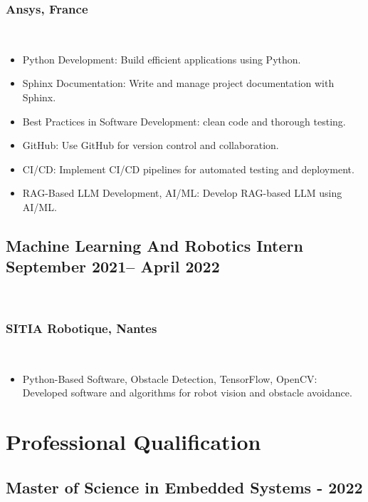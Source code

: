 \documentclass[12pt]{article}
\begin{document}
\subsubsection{Ansys, France} \\ \smallskip
\begin{itemize}
    \item[\textbullet] Python Development: Build efficient applications using Python.
    \item[\textbullet] Sphinx Documentation: Write and manage project documentation with Sphinx.
    \item[\textbullet] Best Practices in Software Development: clean code and thorough testing.
    \item[\textbullet] GitHub: Use GitHub for version control and collaboration.
    \item[\textbullet] CI/CD: Implement CI/CD pipelines for automated testing and deployment.
    \item[\textbullet] RAG-Based LLM Development, AI/ML: Develop RAG-based LLM using AI/ML.
\end{itemize}

\subsection{Machine Learning And Robotics Intern \hfill \normalfont September 2021-- April 2022} \\ \smallskip
\subsubsection{SITIA Robotique, Nantes} \\ \smallskip
\begin{itemize}
    \item[\textbullet] Python-Based Software, Obstacle Detection, TensorFlow, OpenCV: Developed software and algorithms for robot vision and obstacle avoidance.
\end{itemize}

\section{Professional Qualification}
\subsection{Master of Science in Embedded Systems \hfill {} - 2022} \\ \smallskip
\end{document}
